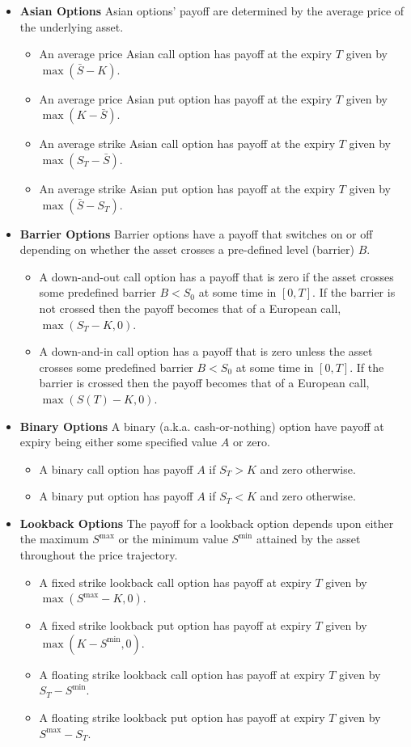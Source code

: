 \begin{itemize} \label{lst:exotic_options}
    \item \textbf{Asian Options} Asian options' payoff are determined by the average price of the underlying asset.
    \begin{itemize}
		\item An average price Asian call option has payoff at the expiry $T$ given by $\max(\bar{S} - K)$.
		\item An average price Asian put option has payoff at the expiry $T$ given by $\max(K - \bar{S})$.
		\item An average strike Asian call option has payoff at the expiry $T$ given by $\max(S_T - \bar{S})$.
		\item An average strike Asian put option has payoff at the expiry $T$ given by $\max(\bar{S} - S_T)$.
	\end{itemize}
    \item \textbf{Barrier Options} Barrier options have a payoff that switches on or off depending on whether the asset crosses a pre-defined level (barrier) $B$.
    \begin{itemize}
		\item A down-and-out call option has a payoff that is zero if the asset crosses some predefined barrier $B<S_0$ at some time in $[0, T]$. If the barrier is not crossed then the payoff becomes that of a European call, $\max(S_T - K, 0)$.
		\item A down-and-in call option has a payoff that is zero unless the asset crosses some predefined barrier $B<S_0$ at some time in $[0, T]$. If the barrier is crossed then the payoff becomes that of a European call, $\max(S(T) - K, 0)$.
    \end{itemize}
    \item \textbf{Binary Options} A binary (a.k.a. cash-or-nothing) option have payoff at expiry being either some specified value $A$ or zero.
    \begin{itemize}
		\item A binary call option has payoff $A$ if $S_T>K$ and zero otherwise.
		\item A binary put option has payoff $A$ if $S_T<K$ and zero otherwise.
	\end{itemize}
    \item \textbf{Lookback Options} The payoff for a lookback option depends upon either the maximum $S^{\max}$ or the minimum value $S^{\min}$ attained by the asset throughout the price trajectory.
    \begin{itemize}
		\item A fixed strike lookback call option has payoff at expiry $T$ given by $\max(S^{\max}-K, 0)$.
		\item A fixed strike lookback put option has payoff at expiry $T$ given by $\max(K-S^{\min}, 0)$.
		\item A floating strike lookback call option has payoff at expiry $T$ given by $S_T -S^{\min}$.
		\item A floating strike lookback put option has payoff at expiry $T$ given by $S^{\max} -S_T$.
    \end{itemize} 
\end{itemize}

